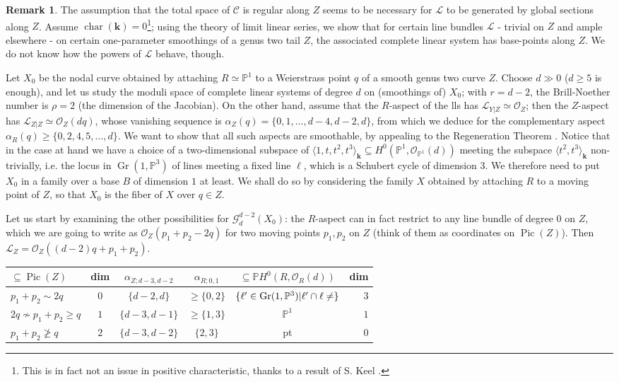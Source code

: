 \documentclass[11pt]{amsart}
\newcommand{\PP}{\mathbb P}
\renewcommand{\k}{\mathbf k}
\newcommand{\OO}{\mathcal O}
\newcommand{\Pic}{\operatorname{Pic}}
\theoremstyle{plain}
\theoremstyle{definition}
\newtheorem{rem}[thm]{Remark}
\begin{document}
\begin{rem}
 The assumption that the total space of $\mathcal C$ is regular along $Z$ seems to be necessary for $\mathcal L$ to be generated by global sections along $Z$. Assume $\operatorname{char}(\k)=0$\footnote{This is in fact not an issue in positive characteristic, thanks to a result of S. Keel \cite{Keel-bpf}.}; using the theory of limit linear series, we show that for certain line bundles $\mathcal L$ - trivial on $Z$ and ample elsewhere - on certain one-parameter smoothings of a genus two tail $Z$, the associated complete linear system has base-points along $Z$. We do not know how the powers of $\mathcal L$ behave, though.
 
 Let $X_0$ be the nodal curve obtained by attaching $R\simeq\PP^1$ to a Weierstrass point $q$ of a smooth genus two curve $Z$. Choose $d\gg 0$ ($d\geq5$ is enough), and let us study the moduli space of complete linear systems of degree $d$ on (smoothings of) $X_0$; with $r=d-2$, the Brill-Noether number is $\rho=2$ (the dimension of the Jacobian). On the other hand, assume that the $R$-aspect of the lls has $\mathcal L_{Y|Z}\simeq\OO_Z$; then the $Z$-aspect has $\mathcal L_{Z|Z}\simeq\OO_Z(dq)$, whose vanishing sequence is $\alpha_Z(q)=\{0,1,\ldots,d-4,d-2,d\}$, from which we deduce for the complementary aspect $\alpha_R(q)\geq\{0,2,4,5,\ldots,d\}$. We want to show that all such aspects are smoothable, by appealing to the Regeneration Theorem \cite[Theorem 5.41]{HM}. Notice that in the case at hand we have a choice of a two-dimensional subspace of $\langle 1,t,t^2,t^3\rangle_\k\subseteq H^0(\PP^1,\OO_{\PP^1}(d))$ meeting the subspace $\langle t^2,t^3\rangle_\k$ non-trivially, i.e. the locus in $\operatorname{Gr}(1,\PP^3)$ of lines meeting a fixed line $\ell$, which is a Schubert cycle of dimension $3$. We therefore need to put $X_0$ in a family over a base $B$ of dimension $1$ at least.  We shall do so by considering the family $X$ obtained by attaching $R$ to a moving point of $Z$, so that $X_0$ is the fiber of $X$ over $q\in Z$.
 
 Let us start by examining the other possibilities for $\mathcal G^{d-2}_d(X_0)$: the $R$-aspect can in fact restrict to any line bundle of degree $0$ on $Z$, which we are going to write as $\OO_Z(p_1+p_2-2q)$ for two moving points $p_1,p_2$ on $Z$ (think of them as coordinates on $\Pic(Z)$). Then $\mathcal L_Z=\OO_Z((d-2)q+p_1+p_2)$.
 
 \hspace{-.7cm} \begin{tabular}{lc|c|c|cr}
  $\subseteq\Pic(Z)$ & dim & $\alpha_{Z;d-3,d-2}$ & $\alpha_{R;0,1}$ & $\subseteq \PP H^0(R,\OO_R(d))$ & dim \\ \hline
  $p_1+p_2\sim 2q$ & $0$ & $\{d-2,d\}$ & $\geq\{0,2\}$ & $\{\ell^\prime\in\operatorname{Gr}(1,\PP^3)|\ell^\prime\cap\ell\neq\empty
  \}$ & $3$\\
  $2q\nsim p_1+p_2\geq q$ & $1$ & $\{d-3,d-1\}$ & $\geq\{1,3\}$ & $\PP^1$ & $1$\\
  $p_1+p_2\ngeq q$ & $2$ & $\{d-3,d-2\}$ & $\{2,3\}$ & pt & $0$\\
 \end{tabular}


\end{rem}
\end{document}
